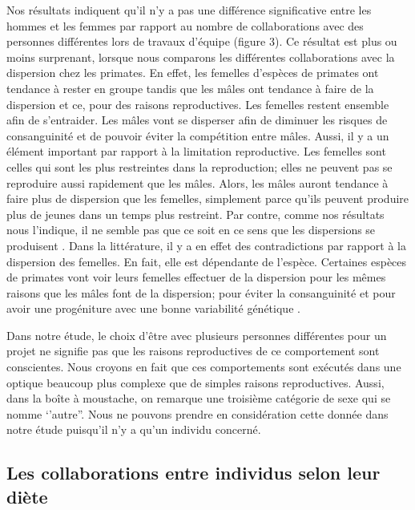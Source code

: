\documentclass[twoside,twocolumn]{article}
\begin{document}
Nos résultats indiquent qu'il n'y a pas une différence significative entre les hommes et les femmes par rapport au nombre de collaborations avec des personnes différentes lors de travaux d'équipe (figure 3). Ce résultat est plus ou moins surprenant, lorsque nous comparons les différentes collaborations avec la dispersion chez les primates. En effet, les femelles d'espèces de primates ont tendance à rester en groupe tandis que les mâles ont tendance à faire de la dispersion et ce, pour des raisons reproductives. Les femelles restent ensemble afin de s'entraider. Les mâles vont se disperser afin de diminuer les risques de consanguinité et de pouvoir éviter la compétition entre mâles. Aussi, il y a un élément important par rapport à la limitation reproductive. Les femelles sont celles qui sont les plus restreintes dans la reproduction; elles ne peuvent pas se reproduire aussi rapidement que les mâles. Alors, les mâles auront tendance à faire plus de dispersion que les femelles, simplement parce qu'ils peuvent produire plus de jeunes dans un temps plus restreint. Par contre, comme nos résultats nous l'indique, il ne semble pas que ce soit en ce sens que les dispersions se produisent \citep{diaz2014no}. Dans la littérature, il y a en effet des contradictions par rapport à la dispersion des femelles. En fait, elle est dépendante de l'espèce. Certaines espèces de primates vont voir leurs femelles effectuer de la dispersion pour les mêmes raisons que les mâles font de la dispersion; pour éviter la consanguinité et pour avoir une progéniture avec une bonne variabilité génétique \citep{jack2009female}.

Dans notre étude, le choix d'être avec plusieurs personnes différentes pour un projet ne signifie pas que les raisons reproductives de ce comportement sont conscientes. Nous croyons en fait que ces comportements sont exécutés dans une optique beaucoup plus complexe que de simples raisons reproductives. Aussi, dans la boîte à moustache, on remarque une troisième catégorie de sexe qui se nomme ‘'autre''. Nous ne pouvons prendre en considération cette donnée dans notre étude puisqu'il n'y a qu'un individu concerné.


\subsection{Les collaborations entre individus selon leur diète}
\end{document}
